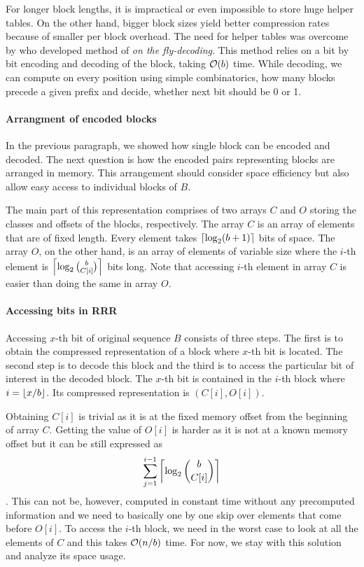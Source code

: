 For longer block lengths, it is impractical or even impossible to store huge helper tables. On the other
hand, bigger block sizes yield better compression rates because of smaller per block overhead. The need for
helper tables was overcome by \cite{navarro2012fast} who developed method of \textit{on the fly-decoding}.
This method relies on a bit by bit encoding and decoding of the block, taking $\mathcal{O}(b)$ time. While decoding,
we can compute on every position using simple combinatorics, how many blocks precede a given prefix and decide,
whether next bit should be 0 or 1.

\paragraph{Arrangment of encoded blocks}

In the previous paragraph, we showed how single block can be encoded and decoded. The next question is how the
encoded pairs representing blocks are arranged in memory. This arrangement should consider space efficiency
but also allow easy access to individual blocks of $B$. 

The main part of this representation comprises of two arrays $C$ and $O$ storing the classes and offsets of
the blocks, respectively. The array $C$ is an array of elements that are of fixed length. Every element takes
$\left\lceil \log_2(b+1) \right\rceil$ bits of space. The array $O$, on the other hand, is an array of elements of variable
size where the $i$-th element is $\left\lceil \log_2{b\choose C[i]} \right\rceil$ bits long. Note that accessing $i$-th element
in array $C$ is easier than doing the same in array $O$.

\paragraph{Accessing bits in RRR}

Accessing $x$-th bit of original sequence $B$ consists of three steps. The first is to obtain the
compressed representation of a block where $x$-th bit is located. The second step is to decode this block and
the third is to access the particular bit of interest in the decoded block. The $x$-th bit is contained in the
$i$-th block where $i=\left\lfloor x/b \right\rfloor$. Its compressed representation is $(C[i], O[i])$.

Obtaining $C[i]$ is trivial as it is at the fixed memory offset from the beginning of array $C$. Getting the
value of $O[i]$ is harder as it is not at a known memory offset but it can be still expressed as
$$\sum_{j=1}^{i-1} \left\lceil \log_2{b\choose C[i]} \right\rceil$$. This can not be, however, computed in constant time without
any precomputed information and we need to basically one by one skip over elements that come before $O[i]$.
To access the $i$-th block, we need in the worst case to look at all the elements of $C$ and this
takes $\mathcal{O}(n/b)$ time. For now, we stay with this solution and analyze its space usage.

